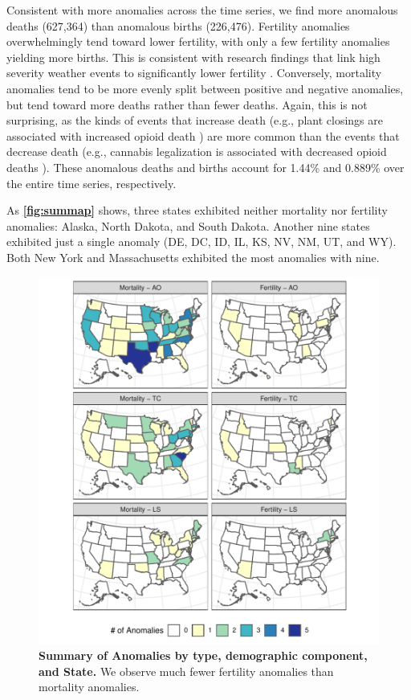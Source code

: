 \documentclass[12pt]{article}
\begin{document}
Consistent with more anomalies across the time series, we find more
anomalous deaths (627,364) than anomalous births (226,476). Fertility
anomalies overwhelmingly tend toward lower fertility, with only a few
fertility anomalies yielding more births. This is consistent with
research findings that link high severity weather events to
significantly lower fertility \citep{Evans2008Hurricanebirth}.
Conversely, mortality anomalies tend to be more evenly split between
positive and negative anomalies, but tend toward more deaths rather than
fewer deaths. Again, this is not surprising, as the kinds of events that
increase death (e.g., plant closings are associated with increased
opioid death \citep{Venkataramani2019}) are more common than the events
that decrease death (e.g., cannabis legalization is associated with
decreased opioid deaths \citep{Livingston2017Cannabis}). These anomalous
deaths and births account for 1.44\% and 0.889\% over the entire time
series, respectively.

As \textbf{\autoref{fig:summap}} shows, three states exhibited neither
mortality nor fertility anomalies: Alaska, North Dakota, and South
Dakota. Another nine states exhibited just a single anomaly (DE, DC, ID,
IL, KS, NV, NM, UT, and WY). Both New York and Massachusetts exhibited
the most anomalies with nine.

\begin{figure}
\centering
\includegraphics{MainDocument_files/figure-latex/AnomalyMap-1.pdf}
\caption{\textbf{Summary of Anomalies by type, demographic component, and State.}
We observe much fewer fertility anomalies than mortality anomalies.
\label{fig:summap}}
\end{figure}
\end{document}
